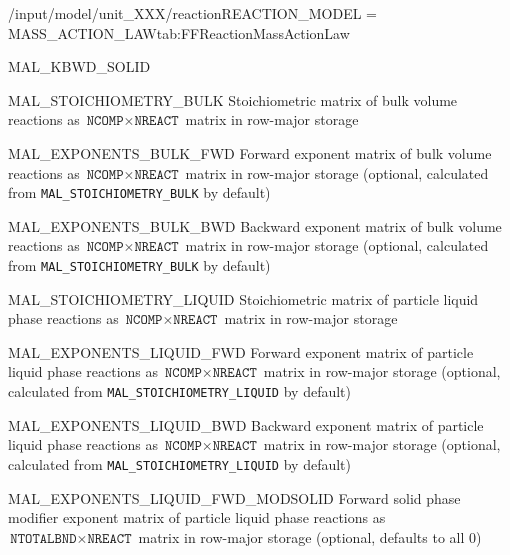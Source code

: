 \begin{condsubgroup}{/input/model/unit\_XXX/reaction}{REACTION\_MODEL = MASS\_ACTION\_LAW}{tab:FFReactionMassActionLaw}
\begin{dataset}[type=double,range={$\geq 0$},length={\texttt{NREACT}}]{MAL\_KBWD\_SOLID}
  \end{dataset}
  \begin{dataset}[type=double,length={$\texttt{NCOMP} \cdot \texttt{NREACT}$}]{MAL\_STOICHIOMETRY\_BULK
}
    Stoichiometric matrix of bulk volume reactions as $\texttt{NCOMP} \times \texttt{NREACT}$ matrix in row-major storage
  \end{dataset}
  \begin{dataset}[type=double,length={$\texttt{NCOMP} \cdot \texttt{NREACT}$}]{MAL\_EXPONENTS\_BULK\_FWD
}
    Forward exponent matrix of bulk volume reactions as $\texttt{NCOMP} \times \texttt{NREACT}$ matrix in row-major storage (optional, calculated from \texttt{MAL\_STOICHIOMETRY\_BULK} by default)
  \end{dataset}
  \begin{dataset}[type=double,length={$\texttt{NCOMP} \cdot \texttt{NREACT}$}]{MAL\_EXPONENTS\_BULK\_BWD
}
    Backward exponent matrix of bulk volume reactions as $\texttt{NCOMP} \times \texttt{NREACT}$ matrix in row-major storage (optional, calculated from \texttt{MAL\_STOICHIOMETRY\_BULK} by default)
  \end{dataset}
  \begin{dataset}[type=double,length={$\texttt{NCOMP} \cdot \texttt{NREACT}$}]{MAL\_STOICHIOMETRY\_LIQUID
}
    Stoichiometric matrix of particle liquid phase reactions as $\texttt{NCOMP} \times \texttt{NREACT}$ matrix in row-major storage
  \end{dataset}
  \begin{dataset}[type=double,length={$\texttt{NCOMP} \cdot \texttt{NREACT}$}]{MAL\_EXPONENTS\_LIQUID\_FWD
}
    Forward exponent matrix of particle liquid phase reactions as $\texttt{NCOMP} \times \texttt{NREACT}$ matrix in row-major storage (optional, calculated from \texttt{MAL\_STOICHIOMETRY\_LIQUID} by default)
  \end{dataset}
  \begin{dataset}[type=double,length={$\texttt{NCOMP} \cdot \texttt{NREACT}$}]{MAL\_EXPONENTS\_LIQUID\_BWD
}
    Backward exponent matrix of particle liquid phase reactions as $\texttt{NCOMP} \times \texttt{NREACT}$ matrix in row-major storage (optional, calculated from \texttt{MAL\_STOICHIOMETRY\_LIQUID} by default)
  \end{dataset}
  \begin{dataset}[type=double,length={$\texttt{NTOTALBND} \cdot \texttt{NREACT}$}]{MAL\_EXPONENTS\_LIQUID\_FWD\_MODSOLID
}
    Forward solid phase modifier exponent matrix of particle liquid phase reactions as $\texttt{NTOTALBND} \times \texttt{NREACT}$ matrix in row-major storage (optional, defaults to all $0$)

\end{dataset}
\end{condsubgroup}
